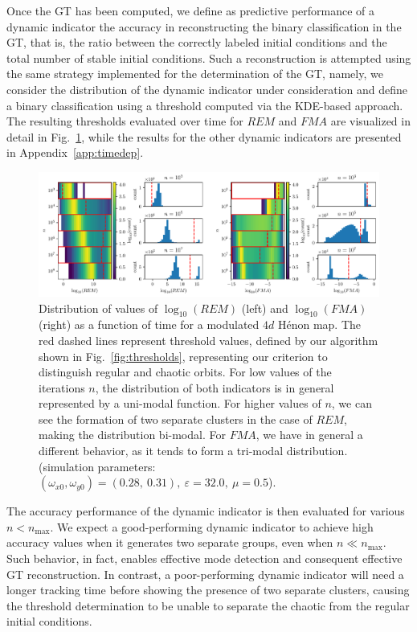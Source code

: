 Once the GT has been computed, we define as predictive performance of a dynamic indicator the accuracy in reconstructing the binary classification in the GT, that is, the ratio between the correctly labeled initial conditions and the total number of stable initial conditions. Such a reconstruction is attempted using the same strategy implemented for the determination of the GT, namely, we consider the distribution of the dynamic indicator under consideration and define a binary classification using a threshold computed via the KDE-based approach. The resulting thresholds evaluated over time for $REM$ and $FMA$ are visualized in detail in Fig.~\ref{fig:neo_evolution}, while the results for the other dynamic indicators are presented in Appendix~\ref{app:timedep}.

\begin{figure}[htp]
    \centering
    \includegraphics[width=1.0\textwidth]{6_dynamic_indicators/fig/corrected_figs/neo_evolution_idx_3.pdf}
    \caption{Distribution of values of $\log_{10}(REM)$ (left) and $\log_{10}(FMA)$ (right) as a function of time for a modulated $4d$ Hénon map. The red dashed lines represent threshold values, defined by our algorithm shown in Fig.~\ref{fig:thresholds}, representing our criterion to distinguish regular and chaotic orbits.
    For low values of the iterations $n$, the distribution of both indicators is in general represented by a uni-modal function. For higher values of $n$, we can see the formation of two separate clusters in the case of $REM$, making the distribution bi-modal. For $FMA$, we have in general a different behavior, as it tends to form a tri-modal distribution. (simulation parameters: $(\omega_{x0},\omega_{y0})= (0.28,\ 0.31),\ \varepsilon=32.0,\ \mu=0.5$).}
    \label{fig:neo_evolution}
\end{figure}

The accuracy performance of the dynamic indicator is then evaluated for various $n < n_{\text{max}}$. We expect a good-performing dynamic indicator to achieve high accuracy values when it generates two separate groups, even when $n \ll n_{\text{max}}$. Such behavior, in fact, enables effective mode detection and consequent effective GT reconstruction. In contrast, a poor-performing dynamic indicator will need a longer tracking time before showing the presence of two separate clusters, causing the threshold determination to be unable to separate the chaotic from the regular initial conditions.

